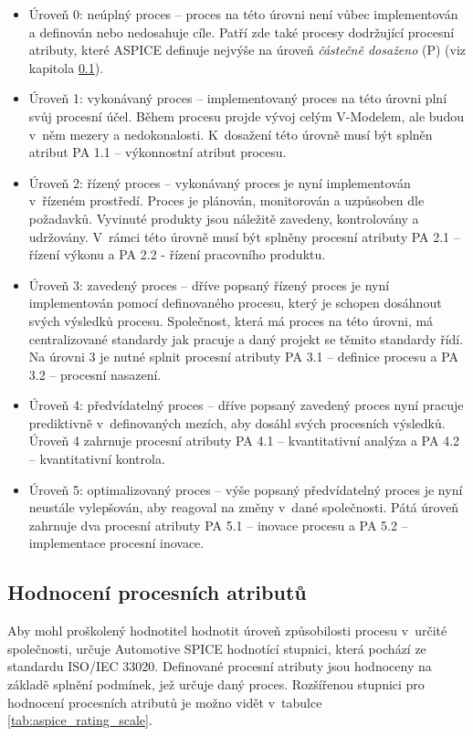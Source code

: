 \documentclass[czech,master]{diploma}
\begin{document}
\begin{itemize}
\item Úroveň 0: neúplný proces -- proces na této úrovni není vůbec implementován a definován nebo nedosahuje cíle. Patří zde také procesy dodržující procesní atributy, které ASPICE definuje nejvýše na úroveň \textit{částečně dosaženo} (P) (viz kapitola \ref{sec:process_atributes}).

\item Úroveň 1: vykonávaný proces -- implementovaný proces na této úrovni plní svůj procesní účel. Během procesu projde vývoj celým V-Modelem, ale budou v~něm mezery a nedokonalosti. K~dosažení této úrovně musí být splněn atribut PA 1.1 -- výkonnostní atribut procesu.

\item Úroveň 2: řízený proces -- vykonávaný proces je nyní implementován v~řízeném prostředí. Proces je plánován, monitorován a uzpůsoben dle požadavků. Vyvinuté produkty jsou náležitě zavedeny, kontrolovány a udržovány. V~rámci této úrovně musí být splněny procesní atributy PA 2.1 -- řízení výkonu a PA 2.2 - řízení pracovního produktu.

\item Úroveň 3: zavedený proces -- dříve popsaný řízený proces je nyní implementován pomocí definovaného procesu, který je schopen dosáhnout svých výsledků procesu. Společnost, která má proces na této úrovni, má centralizované standardy jak pracuje a daný projekt se těmito standardy řídí. Na úrovni 3 je nutné splnit procesní atributy PA 3.1 -- definice procesu a PA 3.2 -- procesní nasazení.

\item Úroveň 4: předvídatelný proces -- dříve popsaný zavedený proces nyní pracuje prediktivně v~definovaných mezích, aby dosáhl svých procesních výsledků. Úroveň 4 zahrnuje procesní atributy PA 4.1 -- kvantitativní analýza a PA 4.2 -- kvantitativní kontrola.

\item Úroveň 5: optimalizovaný proces -- výše popsaný předvídatelný proces je nyní neustále vylepšován, aby reagoval na změny v~dané společnosti. Pátá úroveň zahrnuje dva procesní atributy PA 5.1 -- inovace procesu a PA 5.2 -- implementace procesní inovace.

\end{itemize}

\subsection{Hodnocení procesních atributů}
\label{sec:process_atributes}
Aby mohl proškolený hodnotitel hodnotit úroveň způsobilosti procesu v~určité společnosti, určuje Automotive SPICE hodnotící stupnici, která pochází ze standardu ISO/IEC 33020. Definované procesní atributy jsou hodnoceny na základě splnění podmínek, jež určuje daný proces. Rozšířenou stupnici pro hodnocení procesních atributů je možno vidět v~tabulce \ref{tab:aspice_rating_scale}.
\end{document}
